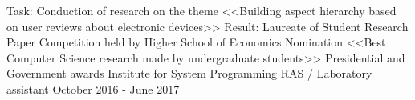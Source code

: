 \begin{cventries}

\cventry
{Task: Conduction of research on the theme <<Building aspect hierarchy based on user reviews about electronic devices>>
		\newline Result: Laureate of Student Research Paper Competition held by Higher School of Economics
		\newline Nomination <<Best Computer Science research made by undergraduate students>>
		\newline Presidential and Government awards
		\newline
	} %
{Institute for System Programming RAS / Laboratory assistant} %
{} %
{October 2016 - June 2017} %
\noindent	



\end{cventries}